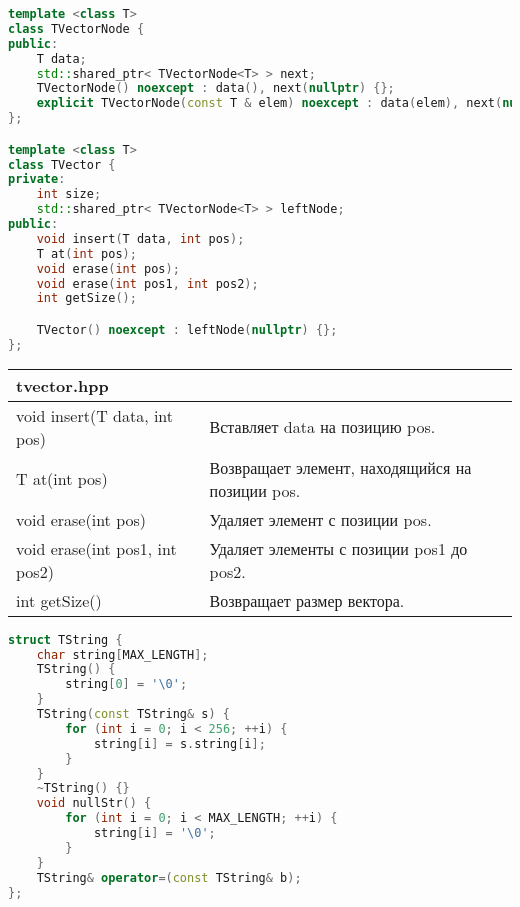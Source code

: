 \begin{lstlisting}[language=C++]
template <class T>
class TVectorNode {
public:
	T data;
	std::shared_ptr< TVectorNode<T> > next;
	TVectorNode() noexcept : data(), next(nullptr) {};
	explicit TVectorNode(const T & elem) noexcept : data(elem), next(nullptr) {};
};

template <class T>
class TVector {
private:
	int size;
	std::shared_ptr< TVectorNode<T> > leftNode;
public:
	void insert(T data, int pos);
	T at(int pos);
	void erase(int pos);
	void erase(int pos1, int pos2);
	int getSize();

	TVector() noexcept : leftNode(nullptr) {};
};
\end{lstlisting}

\begin{longtable}{|p{7.5cm}|p{7.5cm}|}
\hline
\rowcolor{lightgray}
\multicolumn{2}{|c|} {tvector.hpp}\\
\hline
{\ttfamily void insert(T data, int pos)}&Вставляет {\ttfamily data} на позицию {\ttfamily pos}.\\
\hline
{\ttfamily T at(int pos)}&Возвращает элемент, находящийся на позиции {\ttfamily pos}.\\
\hline
{\ttfamily void erase(int pos)}&Удаляет элемент с позиции {\ttfamily pos}.\\
\hline
{\ttfamily void erase(int pos1, int pos2)}&Удаляет элементы с позиции {\ttfamily pos1} до {\ttfamily pos2}.\\
\hline
{\ttfamily int getSize()}&Возвращает размер вектора.\\
\hline
\end{longtable}

\begin{lstlisting}[language=C++]
	struct TString {
    char string[MAX_LENGTH];
    TString() {
        string[0] = '\0';
    }
    TString(const TString& s) {
        for (int i = 0; i < 256; ++i) {
            string[i] = s.string[i];
        }
    }
    ~TString() {}
    void nullStr() {
        for (int i = 0; i < MAX_LENGTH; ++i) {
            string[i] = '\0';
        }
    }
    TString& operator=(const TString& b);
};
\end{lstlisting}

